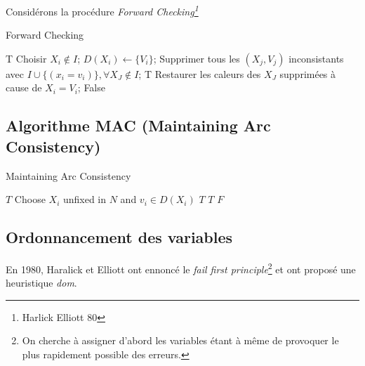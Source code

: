 \documentclass[a4paper,11pt]{thesis}
\begin{document}
Considérons la procédure \em{Forward Checking}\footnote{Harlick Elliott 80}

\begin{algorithm}
    \caption{Forward Checking}
    \label{algo_fc}
    \begin{algorithmic}[1]
                \State \Return T
            \EndIf
            \State Choisir $X_i \not \in I$;
                \State $D(X_i) \gets \{V_i\}$;
                \State Supprimer tous les $(X_j, V_j)$ inconsistants avec $I \cup \{(x_i = v_i)\}, \forall X_J \not \in I$;
                        \State \Return T
                    \EndIf
                \EndIf
                \State Restaurer les caleurs des $X_J$ supprimées à cause de $X_i = V_i$;
            \EndFor
            \State \Return False
        \EndFunction
    \end{algorithmic}
\end{algorithm}

\subsection{Algorithme MAC (Maintaining Arc Consistency)}

\begin{algorithm}
    \caption{Maintaining Arc Consistency}
    \label{alg_mac}
    \begin{algorithmic}[1]
                    \State \Return $T$
                \EndIf
                \State Choose $X_i$ unfixed in $N$ and $v_i \in D(X_i)$
                    \State \Return $T$
                \EndIf
                    \State \Return $T$
                \EndIf
            \EndIf
            \State \Return $F$
        \EndFunction
    \end{algorithmic}
\end{algorithm}

\subsection{Ordonnancement des variables}

En 1980, Haralick et Elliott ont ennoncé le \emph{fail first principle}\footnote{On cherche à
assigner d'abord les variables étant à même de provoquer le plus rapidement possible des erreurs.}
et ont proposé une heuristique \emph{dom}.
\end{document}
